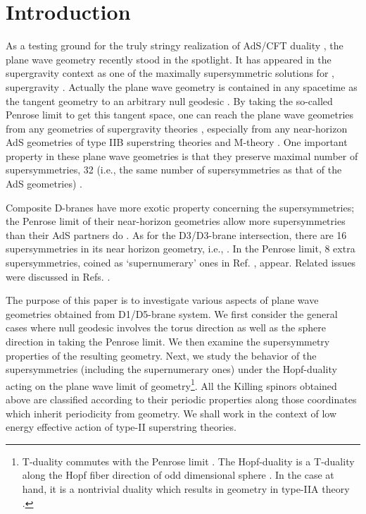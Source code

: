 \documentclass[a4paper,12pt]{article}
\begin{document}
\section{Introduction}

As a testing ground for the truly stringy realization of AdS/CFT duality \cite{maldacena}, the plane wave geometry recently stood in the spotlight. It has appeared in the supergravity context as one of the maximally supersymmetric solutions for \coordHE{}, \coordHE{} supergravity \cite{kowalski}. Actually the plane wave geometry is contained in any spacetime as the tangent geometry to an arbitrary null geodesic \cite{penrose}. By taking the so-called Penrose limit to get this tangent space, one can reach the plane wave geometries from any geometries of \coordHE{} supergravity theories \cite{gueven1,gueven2}, especially from any near-horizon AdS geometries of type IIB superstring theories and M-theory \cite{blau2,blau3}. One important property in these plane wave geometries is that they preserve maximal number of supersymmetries, 32 (i.e., the same number of supersymmetries as that of the AdS geometries) \cite{blau1,figueroa}. 

Composite D-branes have more exotic property concerning the supersymmetries; the Penrose limit of their near-horizon geometries allow more supersymmetries than their AdS partners do \cite{cvetic,gauntlett}. As for the D3/D3-brane intersection, there are 16 supersymmetries in its near horizon geometry, i.e., \coordHE{}. In the Penrose limit, 8 extra supersymmetries, coined as `supernumerary' ones in Ref. \cite{cvetic}, appear. Related issues were discussed in Refs. \cite{lu2,singh,kumar}.

The purpose of this paper is to investigate various aspects of plane wave geometries obtained from D1/D5-brane system. We first consider the general cases where null geodesic involves the torus direction as well as the sphere direction in taking the Penrose limit. We then examine the supersymmetry properties of the resulting geometry. Next, we study the behavior of the supersymmetries (including the supernumerary ones) under the Hopf-duality acting on the plane wave limit of \coordHE{} geometry\footnote{T-duality commutes with the Penrose limit \cite{gueven2}. The Hopf-duality is a T-duality along the Hopf fiber direction of odd dimensional sphere \cite{duff2}. In the case at hand, it is a nontrivial duality which results in \coordHE{} geometry in type-IIA theory \cite{duff}.}.  All the Killing spinors obtained above are classified according to their periodic properties along those coordinates which inherit periodicity from \coordHE{} geometry. We shall work in the context of low energy effective action of type-II superstring theories.
\end{document}
